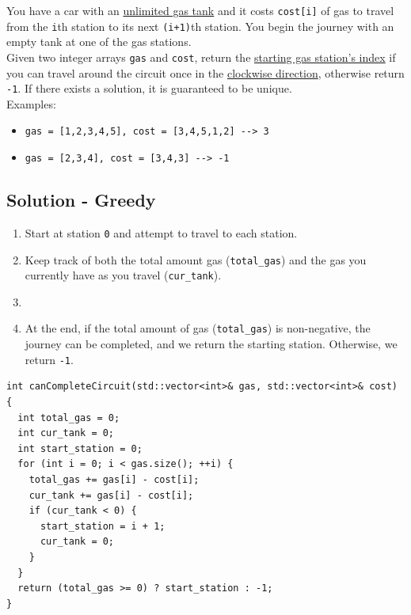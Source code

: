 You have a car with an \ul{unlimited gas tank} and it costs {\colorbox{CodeBackground}{\lstinline|cost[i]|}} of gas to travel from the {\colorbox{CodeBackground}{\lstinline|i|}}th station to its next {\colorbox{CodeBackground}{\lstinline|(i+1)|}}th station. You begin the journey with an empty tank at one of the gas stations.\\

Given two integer arrays {\colorbox{CodeBackground}{\lstinline|gas|}} and {\colorbox{CodeBackground}{\lstinline|cost|}}, return the \ul{starting gas station's index} if you can travel around the circuit once in the \ul{clockwise direction}, otherwise return {\colorbox{CodeBackground}{\lstinline|-1|}}. If there exists a solution, it is guaranteed to be unique.\\

Examples:
\begin{itemize}
	\item {\colorbox{CodeBackground}{\lstinline|gas = [1,2,3,4,5], cost = [3,4,5,1,2] --> 3|}}
	\item {\colorbox{CodeBackground}{\lstinline|gas = [2,3,4], cost = [3,4,3] --> -1|}}
\end{itemize}

\subsection*{Solution - Greedy}
\begin{enumerate}
\item Start at station {\colorbox{CodeBackground}{\lstinline|0|}} and attempt to travel to each station.
\item Keep track of both the total amount gas ({\colorbox{CodeBackground}{\lstinline|total_gas|}}) and the gas you currently have as you travel ({\colorbox{CodeBackground}{\lstinline|cur_tank|}}).
\item {\color{magenta}{If you ever run out of gas before reaching the next station, consider that station as a new starting point.}}
\item At the end, if the total amount of gas ({\colorbox{CodeBackground}{\lstinline|total_gas|}}) is non-negative, the journey can be completed, and we return the starting station. Otherwise, we return {\colorbox{CodeBackground}{\lstinline|-1|}}.
\end{enumerate}

\begin{lstlisting}
int canCompleteCircuit(std::vector<int>& gas, std::vector<int>& cost) {
  int total_gas = 0;
  int cur_tank = 0;
  int start_station = 0;
  for (int i = 0; i < gas.size(); ++i) {
    total_gas += gas[i] - cost[i];
    cur_tank += gas[i] - cost[i];
    if (cur_tank < 0) {
      start_station = i + 1;
      cur_tank = 0;
    }
  }
  return (total_gas >= 0) ? start_station : -1;
}
\end{lstlisting}

